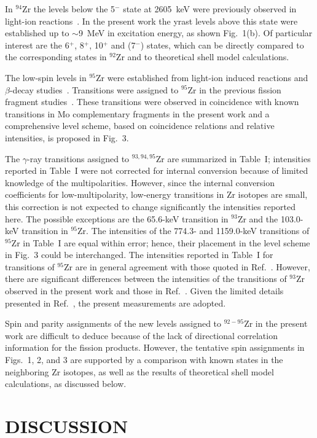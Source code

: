  In $^{94}$Zr the levels below the 5$^{-}$ state at 2605~keV 
were previously observed in light-ion reactions~\cite{NDS4}. In the present
work the yrast levels above this state were established up to $\sim$9~MeV
in excitation energy, as shown Fig.~1(b). 
Of particular interest are the 6$^{+}$,
8$^{+}$, 10$^{+}$ and (7$^{-}$) states, which can be directly compared to the
corresponding states in  $^{92}$Zr and to theoretical shell model calculations.

The low-spin levels in $^{95}$Zr were established from 
light-ion induced reactions and $\beta$-decay
studies~\cite{NDS5}.   
Transitions were assigned to $^{95}$Zr in the previous 
fission fragment studies~\cite{Por}. These transitions were 
observed in coincidence with known
transitions in Mo complementary fragments in the present work 
and a comprehensive level scheme,
based on coincidence relations and relative intensities, is proposed in Fig.~3.

The $\gamma$-ray transitions assigned to $^{93,94,95}$Zr are summarized in 
Table~I; intensities reported in Table~I were not corrected for internal
conversion because of limited knowledge of the multipolarities. However, since
the internal conversion coefficients for low-multipolarity, low-energy
transitions in Zr isotopes are small, this correction is not expected to change
significantly the intensities reported here. The possible exceptions are the
65.6-keV transition in $^{93}$Zr and the 103.0-keV transition in $^{95}$Zr.
The intensities of the 774.3- and 1159.0-keV
transitions of $^{95}$Zr in Table~I are equal within error; hence, their
placement in the level scheme in Fig.~3 could be interchanged. The intensities
reported in Table~I for transitions of $^{95}$Zr are in general agreement with
those quoted in Ref.~\cite{Por}. However, there are significant differences
between the intensities of the transitions of $^{93}$Zr observed in the present
work and those in Ref.~\cite{Por}.  Given the limited details presented 
in Ref.~\cite{Por}, the present measurements are adopted.

Spin and parity assignments of the new levels assigned to $^{92-95}$Zr
in the present work are difficult to deduce because of the lack of directional
correlation information for the fission products. However, the tentative spin
assignments in Figs.~1, 2, and 3 are supported by a comparison with known
states in the neighboring Zr isotopes, as well as the results of theoretical
shell model calculations, as discussed below.

\section{ DISCUSSION}

